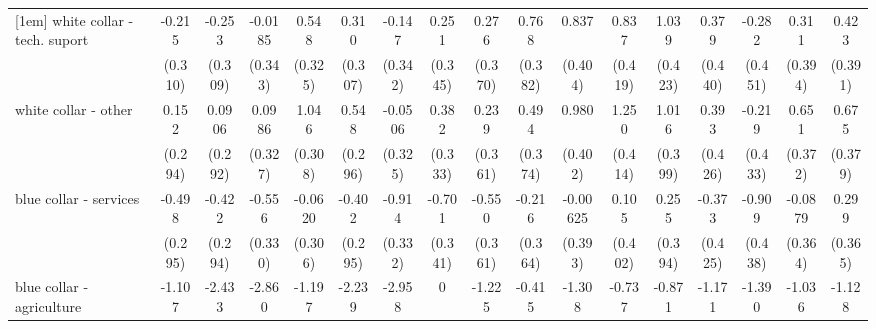 {\begin{tabular}{l*{16}{c}}
[1em]
white collar - tech. suport&      -0.215         &      -0.253         &     -0.0185         &       0.548         &       0.310         &      -0.147         &       0.251         &       0.276         &       0.768\sym{*}  &       0.837\sym{*}  &       0.837\sym{*}  &       1.039\sym{*}  &       0.379         &      -0.282         &       0.311         &       0.423         \\
                    &     (0.310)         &     (0.309)         &     (0.343)         &     (0.325)         &     (0.307)         &     (0.342)         &     (0.345)         &     (0.370)         &     (0.382)         &     (0.404)         &     (0.419)         &     (0.423)         &     (0.440)         &     (0.451)         &     (0.394)         &     (0.391)         \\
[1em]
white collar - other&       0.152         &      0.0906         &      0.0986         &       1.046\sym{***}&       0.548         &     -0.0506         &       0.382         &       0.239         &       0.494         &       0.980\sym{*}  &       1.250\sym{**} &       1.016\sym{*}  &       0.393         &      -0.219         &       0.651         &       0.675         \\
                    &     (0.294)         &     (0.292)         &     (0.327)         &     (0.308)         &     (0.296)         &     (0.325)         &     (0.333)         &     (0.361)         &     (0.374)         &     (0.402)         &     (0.414)         &     (0.399)         &     (0.426)         &     (0.433)         &     (0.372)         &     (0.379)         \\
[1em]
blue collar - services&      -0.498         &      -0.422         &      -0.556         &     -0.0620         &      -0.402         &      -0.914\sym{**} &      -0.701\sym{*}  &      -0.550         &      -0.216         &    -0.00625         &       0.105         &       0.255         &      -0.373         &      -0.909\sym{*}  &     -0.0879         &       0.299         \\
                    &     (0.295)         &     (0.294)         &     (0.330)         &     (0.306)         &     (0.295)         &     (0.332)         &     (0.341)         &     (0.361)         &     (0.364)         &     (0.393)         &     (0.402)         &     (0.394)         &     (0.425)         &     (0.438)         &     (0.364)         &     (0.365)         \\
[1em]
blue collar - agriculture&      -1.107         &      -2.433\sym{**} &      -2.860\sym{*}  &      -1.197         &      -2.239\sym{*}  &      -2.958\sym{**} &           0         &      -1.225         &      -0.415         &      -1.308         &      -0.737         &      -0.871         &      -1.171         &      -1.390         &      -1.036         &      -1.128         \\

\end{tabular}}
